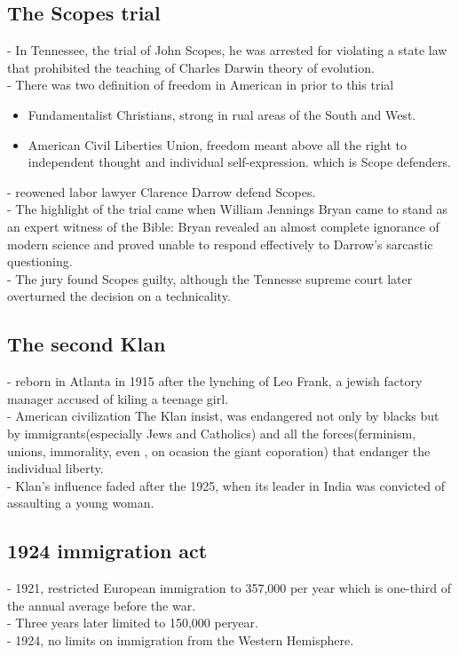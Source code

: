 \documentclass{article}
\begin{document}
\subsection{The Scopes trial}
- In Tennessee, the trial of John Scopes, he was arrested for violating a state law that prohibited the teaching of Charles Darwin theory of evolution.\\
- There was two definition of freedom in American in prior to this trial
\begin{itemize}
\item Fundamentalist Christians, strong in rual areas of the South and West.
\item American Civil Liberties Union, freedom meant above all the right to independent thought and individual self-expression. which is Scope defenders.
\end{itemize} 
- reowened labor lawyer Clarence Darrow defend Scopes.\\
- The highlight of the trial came when William Jennings Bryan came to stand as an expert witness of the Bible: Bryan revealed an almost complete ignorance of modern science and proved unable to respond effectively to Darrow's sarcastic questioning.\\
- The jury found Scopes guilty, although the Tennesse supreme court later overturned the decision on a technicality.\\

\subsection{The second Klan}
- reborn in Atlanta in 1915 after the lynching of Leo Frank, a jewish factory manager accused of kiling a teenage girl. \\
- American civilization The Klan insist, was endangered not only by blacks but by immigrants(especially Jews and Catholics) and all the forces(ferminism, unions, immorality, even , on ocasion the giant coporation) that endanger the individual liberty.\\
- Klan's influence faded after the 1925, when its leader in India was convicted of assaulting a young woman.\\

\subsection{1924 immigration act}
- 1921, restricted European immigration to 357,000 per year which is one-third of the annual average before the war.\\
- Three years later limited to 150,000 peryear. \\
- 1924, no limits on immigration from the Western Hemisphere.\\
\end{document}
